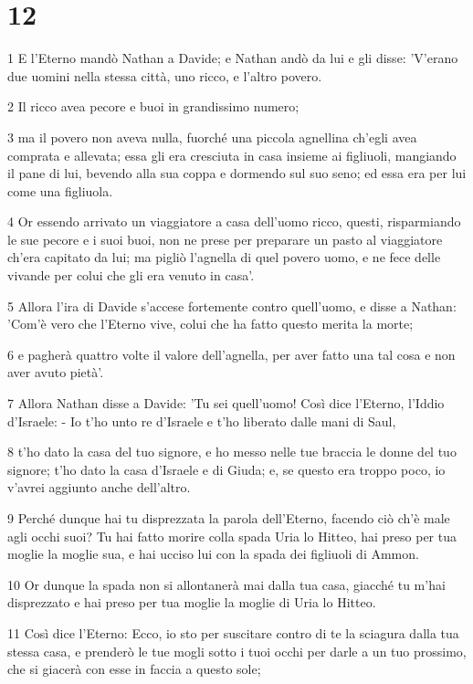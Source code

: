\chapter{12}

\par 1 E l'Eterno mandò Nathan a Davide; e Nathan andò da lui e gli disse: 'V'erano due uomini nella stessa città, uno ricco, e l'altro povero.
\par 2 Il ricco avea pecore e buoi in grandissimo numero;
\par 3 ma il povero non aveva nulla, fuorché una piccola agnellina ch'egli avea comprata e allevata; essa gli era cresciuta in casa insieme ai figliuoli, mangiando il pane di lui, bevendo alla sua coppa e dormendo sul suo seno; ed essa era per lui come una figliuola.
\par 4 Or essendo arrivato un viaggiatore a casa dell'uomo ricco, questi, risparmiando le sue pecore e i suoi buoi, non ne prese per preparare un pasto al viaggiatore ch'era capitato da lui; ma pigliò l'agnella di quel povero uomo, e ne fece delle vivande per colui che gli era venuto in casa'.
\par 5 Allora l'ira di Davide s'accese fortemente contro quell'uomo, e disse a Nathan: 'Com'è vero che l'Eterno vive, colui che ha fatto questo merita la morte;
\par 6 e pagherà quattro volte il valore dell'agnella, per aver fatto una tal cosa e non aver avuto pietà'.
\par 7 Allora Nathan disse a Davide: 'Tu sei quell'uomo! Così dice l'Eterno, l'Iddio d'Israele: - Io t'ho unto re d'Israele e t'ho liberato dalle mani di Saul,
\par 8 t'ho dato la casa del tuo signore, e ho messo nelle tue braccia le donne del tuo signore; t'ho dato la casa d'Israele e di Giuda; e, se questo era troppo poco, io v'avrei aggiunto anche dell'altro.
\par 9 Perché dunque hai tu disprezzata la parola dell'Eterno, facendo ciò ch'è male agli occhi suoi? Tu hai fatto morire colla spada Uria lo Hitteo, hai preso per tua moglie la moglie sua, e hai ucciso lui con la spada dei figliuoli di Ammon.
\par 10 Or dunque la spada non si allontanerà mai dalla tua casa, giacché tu m'hai disprezzato e hai preso per tua moglie la moglie di Uria lo Hitteo.
\par 11 Così dice l'Eterno: Ecco, io sto per suscitare contro di te la sciagura dalla tua stessa casa, e prenderò le tue mogli sotto i tuoi occhi per darle a un tuo prossimo, che si giacerà con esse in faccia a questo sole;
